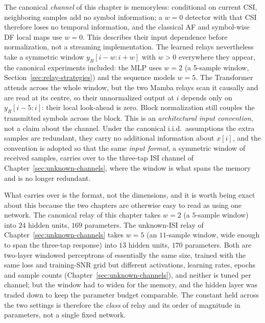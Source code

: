 \begin{remark}\label{rem:window-causality}
The canonical \emph{channel} of this chapter is memoryless: conditional on current CSI, neighboring samples add no symbol information; a $w=0$ detector with that CSI therefore loses no temporal information, and the classical AF and symbol-wise DF local maps use $w=0$. This describes their input dependence before normalization, not a streaming implementation. The learned relays nevertheless take a symmetric window $y_R[i-w:i+w]$ with $w>0$ everywhere they appear, the canonical experiments included: the MLP uses $w=2$ (a 5-sample window, Section~\ref{sec:relay-strategies}) and the sequence models $w=5$. The Transformer attends across the whole window, but the two Mamba relays scan it causally and are read at its centre, so their unnormalized output at $i$ depends only on $y_R[i-5:i]$: their local look-ahead is zero. Block normalization still couples the transmitted symbols across the block. This is an \emph{architectural input convention}, not a claim about the channel. Under the canonical i.i.d.\ assumptions the extra samples are redundant, they carry no additional information about $x[i]$, and the convention is adopted so that the same \emph{input format}, a symmetric window of received samples, carries over to the three-tap ISI channel of Chapter~\ref{sec:unknown-channels}, where the window is what spans the memory and is no longer redundant.

What carries over is the format, not the dimensions, and it is worth being exact about this because the two chapters are otherwise easy to read as using one network. The canonical relay of this chapter takes $w=2$ (a $5$-sample window) into $24$ hidden units, $169$ parameters. The unknown-ISI relay of Chapter~\ref{sec:unknown-channels} takes $w=5$ (an $11$-sample window, wide enough to span the three-tap response) into $13$ hidden units, $170$ parameters. Both are two-layer windowed perceptrons of essentially the same size, trained with the same loss and training-SNR grid but different activations, learning rates, epochs and sample counts (Chapter~\ref{sec:unknown-channels}), and neither is tuned per channel; but the window had to widen for the memory, and the hidden layer was traded down to keep the parameter budget comparable. The constant held across the two settings is therefore the \emph{class} of relay and its order of magnitude in parameters, not a single fixed network.


\end{remark}
